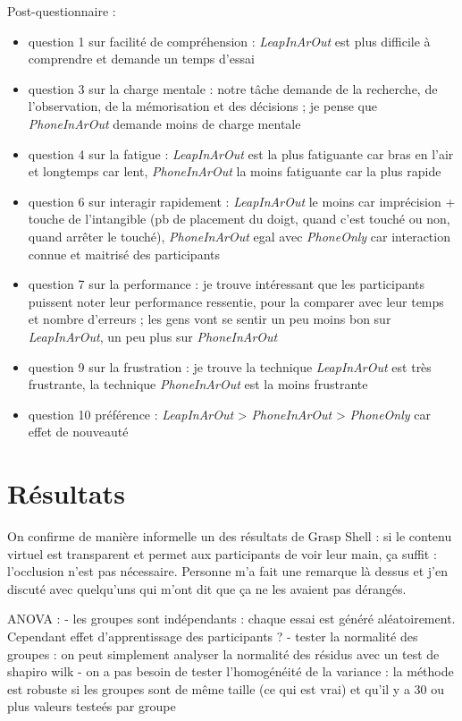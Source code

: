 Post-questionnaire :
\begin{itemize}
  \item question 1 sur facilité de compréhension : \textit{LeapInArOut} est plus difficile à comprendre et demande un temps d'essai
  \item question 3 sur la charge mentale : notre tâche demande de la recherche, de l'observation, de la mémorisation et des décisions ; je pense que \textit{PhoneInArOut} demande moins de charge mentale
  \item question 4 sur la fatigue : \textit{LeapInArOut} est la plus fatiguante car bras en l'air et longtemps car lent, \textit{PhoneInArOut} la moins fatiguante car la plus rapide
  \item question 6 sur interagir rapidement : \textit{LeapInArOut} le moins car imprécision + touche de l'intangible (pb de placement du doigt, quand c'est touché ou non, quand arrêter le touché), \textit{PhoneInArOut} egal avec \textit{PhoneOnly} car interaction connue et maitrisé des participants
  \item question 7 sur la performance : je trouve intéressant que les participants puissent noter leur performance ressentie, pour la comparer avec leur temps et nombre d'erreurs ; les gens vont se sentir un peu moins bon sur \textit{LeapInArOut}, un peu plus sur \textit{PhoneInArOut}
  \item question 9 sur la frustration : je trouve la technique \textit{LeapInArOut} est très frustrante, la technique \textit{PhoneInArOut} est la moins frustrante
  \item question 10 préférence : \textit{LeapInArOut} > \textit{PhoneInArOut} > \textit{PhoneOnly} car effet de nouveauté
\end{itemize}


\section{Résultats}

On confirme de manière informelle un des résultats de Grasp Shell : si le contenu virtuel est transparent et permet aux participants de voir leur main, ça suffit : l'occlusion n'est pas nécessaire. Personne m'a fait une remarque là dessus et j'en discuté avec quelqu'uns qui m'ont dit que ça ne les avaient pas dérangés.

ANOVA :
- les groupes sont indépendants : chaque essai est généré aléatoirement. Cependant effet d'apprentissage des participants ?
- tester la normalité des groupes : on peut simplement analyser la normalité des résidus avec un test de shapiro wilk
- on a pas besoin de tester l'homogénéité de la variance : la méthode est robuste si les groupes sont de même taille (ce qui est vrai) et qu'il y a 30 ou plus valeurs testeés par groupe


